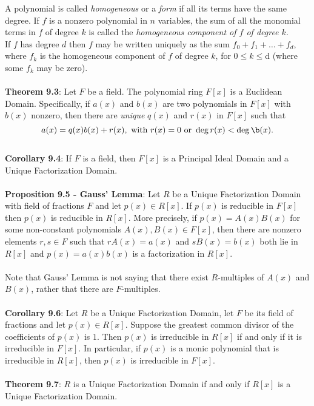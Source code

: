 \documentclass{article}
\begin{document}
A polynomial is called \textit{homogeneous} or a \textit{form} if all its terms have the same degree. If $f$ is a nonzero polynomial in $n$ variables, the sum of all the monomial terms in $f$ of degree $k$ is called the \textit{homogeneous component of $f$ of degree $k$}. \\
If $f$ has degree $d$ then $f$ may be written uniquely as the sum $f_0 + f_1 + \dots + f_d$, where $f_k$ is the homogeneous component of $f$ of degree $k$, for $0 \leq k \leq $d (where some $f_k$ may be zero). \\ \\
\textbf{Theorem 9.3}: Let $F$ be a field. The polynomial ring $F[x]$ is a Euclidean Domain. Specifically, if $a(x)$ and $b(x)$ are two polynomials in $F[x]$ with $b(x)$ nonzero, then there are \textit{unique} $q(x)$ and $r(x)$ in $F[x]$ such that $$a(x) = q(x)b(x) + r(x), \text{ with } r(x) = 0 \text{ or } \deg{r(x)} < \deg{\b(x)}.$$ \\
\textbf{Corollary 9.4}: If $F$ is a field, then $F[x]$ is a Principal Ideal Domain and a Unique Factorization Domain. \\ \\
\textbf{Proposition 9.5 - Gauss' Lemma}: Let $R$ be a Unique Factorization Domain with field of fractions $F$ and let $p(x) \in R[x]$. If $p(x)$ is reducible in $F[x]$ then $p(x)$ is reducible in $R[x]$. More precisely, if $p(x) = A(x)B(x)$ for some non-constant polynomials $A(x), B(x) \in F[x]$, then there are nonzero elements $r, s \in F$ such that $rA(x) = a(x)$ and $sB(x) = b(x)$ both lie in $R[x]$ and $p(x) = a(x)b(x)$ is a factorization in $R[x]$. \\ \\
Note that Gauss' Lemma is not saying that there exist $R$-multiples of $A(x)$ and $B(x)$, rather that there are $F$-multiples. \\ \\
\textbf{Corollary 9.6}: Let $R$ be a Unique Factorization Domain, let $F$ be its field of fractions and
let $p(x) \in R[x]$. Suppose the greatest common divisor of the coefficients of $p(x)$ is $1$. Then $p(x)$ is irreducible in $R[x]$ if and only if it is irreducible in $F[x]$. In particular, if $p(x)$ is a monic polynomial that is irreducible in $R[x]$, then $p(x)$ is irreducible in $F[x]$. \\ \\
\textbf{Theorem 9.7}: $R$ is a Unique Factorization Domain if and only if $R[x]$ is a Unique Factorization Domain. \\ \\
\end{document}
